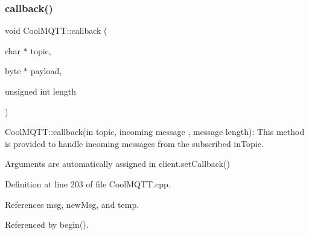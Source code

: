 \subsubsection{\texorpdfstring{callback()}{callback()}}
{\footnotesize\ttfamily void Cool\+M\+Q\+T\+T\+::callback (\begin{DoxyParamCaption}\item[{char $\ast$}]{topic,  }\item[{byte $\ast$}]{payload,  }\item[{unsigned int}]{length }\end{DoxyParamCaption})}

Cool\+M\+Q\+T\+T\+::callback(in topic, incoming message , message length)\+: This method is provided to handle incoming messages from the subscribed in\+Topic.

Arguments are automatically assigned in client.\+set\+Callback() 

Definition at line 203 of file Cool\+M\+Q\+T\+T.\+cpp.



References msg, new\+Msg, and temp.



Referenced by begin().


